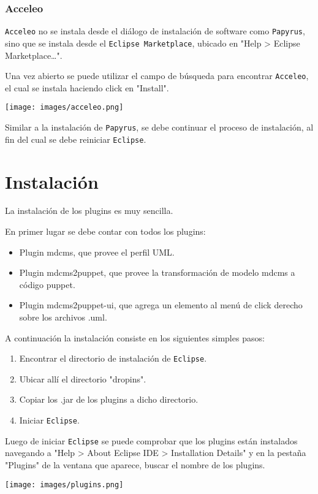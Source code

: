 \documentclass[11pt]{article}
\begin{document}
\subsubsection{Acceleo}
\label{sec:orgfd3943c}
\texttt{Acceleo} no se instala desde el diálogo de instalación de software
como \texttt{Papyrus}, sino que se instala desde el \texttt{Eclipse Marketplace},
ubicado en "Help > Eclipse Marketplace\ldots{}".

Una vez abierto se puede utilizar el campo de búsqueda para encontrar
\texttt{Acceleo}, el cual se instala haciendo click en "Install".

\begin{center}
\texttt{[image: images/acceleo.png]}
\end{center}

Similar a la instalación de \texttt{Papyrus}, se debe continuar el proceso de
instalación, al fin del cual se debe reiniciar \texttt{Eclipse}.

\section{Instalación}
\label{sec:orgb6f475c}
La instalación de los plugins es muy sencilla.

En primer lugar se debe contar con todos los plugins:

\begin{itemize}
\item Plugin mdcms, que provee el perfil UML.
\item Plugin mdcms2puppet, que provee la transformación de modelo mdcms a
código puppet.
\item Plugin mdcms2puppet-ui, que agrega un elemento al menú de click
derecho sobre los archivos .uml.
\end{itemize}

A continuación la instalación consiste en los siguientes simples
pasos:

\begin{enumerate}
\item Encontrar el directorio de instalación de \texttt{Eclipse}.
\item Ubicar allí el directorio "dropins".
\item Copiar los .jar de los plugins a dicho directorio.
\item Iniciar \texttt{Eclipse}.
\end{enumerate}

Luego de iniciar \texttt{Eclipse} se puede comprobar que los plugins están
instalados navegando a "Help > About Eclipse IDE > Installation
Details" y en la pestaña "Plugins" de la ventana que aparece, buscar
el nombre de los plugins.

\begin{center}
\texttt{[image: images/plugins.png]}
\end{center}
\end{document}
